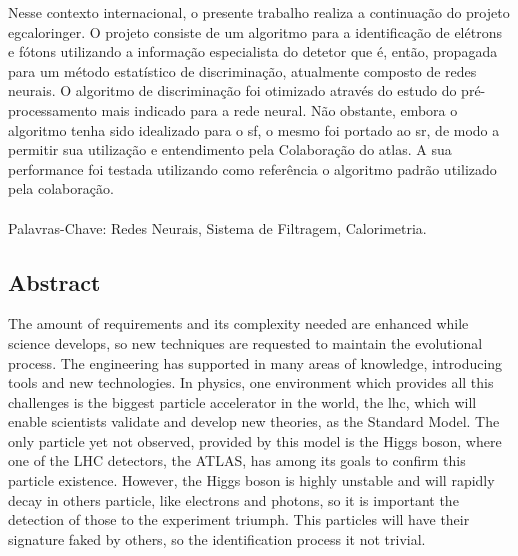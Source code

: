 Nesse contexto internacional, o presente trabalho realiza a continuação
do projeto \acrshort{egcaloringer}. O projeto consiste de um algoritmo 
para a identificação de elétrons e fótons utilizando a informação especialista 
do detetor que é, então, propagada para um método estatístico de discriminação, 
atualmente composto de redes neurais. O algoritmo de discriminação foi otimizado 
através do estudo do pré-processamento mais indicado para a rede neural. 
Não obstante, embora o algoritmo tenha sido idealizado para o \gls{sf}, 
o mesmo foi portado ao \gls{sr}, de modo a permitir sua utilização e 
entendimento pela Colaboração do \acrshort{atlas}. A sua performance foi 
testada utilizando como referência o algoritmo padrão utilizado 
pela colaboração.

\paragraph*{}

\noindent Palavras-Chave: Redes Neurais, Sistema de Filtragem, Calorimetria.

\vfill

\clearpage

\vfill
\begin{center}
\section*{Abstract\label{Abstract}}
\end{center}

The amount of requirements and its complexity needed are enhanced while science
develops, so new techniques are requested to maintain the evolutional process.
The engineering has supported in many areas of knowledge, introducing tools and
new technologies.
In physics, one environment which provides all this challenges is the biggest
particle accelerator in the world, the \acrshort{lhc}, which will enable
scientists validate and develop new theories, as the Standard Model. The only
particle yet not observed, provided by this model is the Higgs boson, where
one of the LHC detectors, the ATLAS, has among its goals to confirm this
particle existence. However, the Higgs boson is highly unstable and will rapidly
decay in others particle, like electrons and photons, so it is important the
detection of those to the experiment triumph. This particles will have their
signature faked by others, so the identification process it not trivial.

